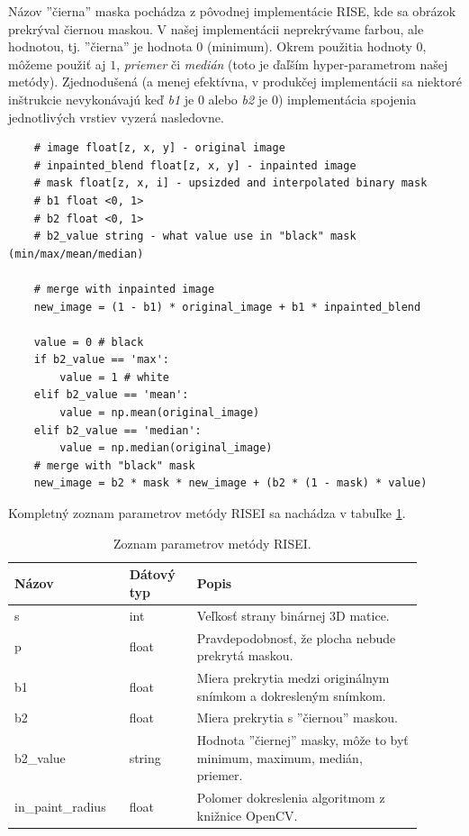 Názov ''čierna'' maska pochádza z pôvodnej implementácie RISE, kde sa obrázok prekrýval čiernou maskou. V našej implementácii neprekrývame farbou, ale hodnotou, tj. ''čierna'' je hodnota $0$ (minimum). Okrem použitia hodnoty $0$, môžeme použiť aj $1$, \textit{priemer} či \textit{medián} (toto je ďaľším hyper-parametrom našej metódy). Zjednodušená (a menej efektívna, v produkčej implementácii sa niektoré inštrukcie nevykonávajú keď \textit{b1} je 0 alebo \textit{b2} je 0) implementácia spojenia jednotlivých vrstiev vyzerá nasledovne.

\begin{lstlisting}
    # image float[z, x, y] - original image
    # inpainted_blend float[z, x, y] - inpainted image
    # mask float[z, x, i] - upsizded and interpolated binary mask
    # b1 float <0, 1>
    # b2 float <0, 1>
    # b2_value string - what value use in "black" mask (min/max/mean/median)

    # merge with inpainted image
    new_image = (1 - b1) * original_image + b1 * inpainted_blend

    value = 0 # black
    if b2_value == 'max':
        value = 1 # white
    elif b2_value == 'mean':
        value = np.mean(original_image)
    elif b2_value == 'median':
        value = np.median(original_image)
    # merge with "black" mask
    new_image = b2 * mask * new_image + (b2 * (1 - mask) * value)
\end{lstlisting}

Kompletný zoznam parametrov metódy RISEI sa nachádza v tabuľke \ref{tab:risei_params}.

\begin{table}[]
    \begin{tabular}{p{0.25\linewidth} | p{0.15\linewidth} | p{0.5\linewidth}}
        \hline
        Názov             & Dátový typ & Popis                                                               \\ \hline
        s                 & int        & Veľkosť strany binárnej 3D matice.                                        \\
        p                 & float      & Pravdepodobnosť, že plocha nebude prekrytá maskou.                        \\
        b1                & float      & Miera prekrytia medzi originálnym snímkom a dokresleným snímkom.          \\
        b2                & float      & Miera prekrytia s ''čiernou'' maskou.                                     \\
        b2\_value         & string     & Hodnota ''čiernej'' masky, môže to byť minimum, maximum, medián, priemer. \\
        in\_paint\_radius & float      & Polomer dokreslenia algoritmom z knižnice OpenCV.                         \\ \hline
    \end{tabular}
    \caption{Zoznam parametrov metódy RISEI.}
    \label{tab:risei_params}
\end{table}

